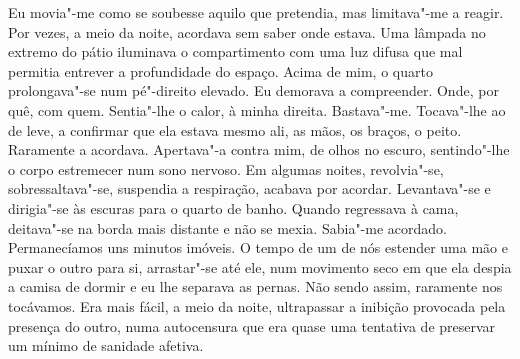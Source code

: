 Eu movia"-me como se soubesse aquilo que pretendia, mas limitava"-me a
reagir. Por vezes, a meio da noite, acordava sem saber onde estava. Uma
lâmpada no extremo do pátio iluminava o compartimento com uma luz difusa
que mal permitia entrever a profundidade do espaço. Acima de mim, o
quarto prolongava"-se num pé"-direito elevado. Eu demorava a
compreender. Onde, por quê, com quem. Sentia"-lhe o calor, à minha
direita. Bastava"-me. Tocava"-lhe ao de leve, a confirmar que ela estava
mesmo ali, as mãos, os braços, o peito. Raramente a acordava.
Apertava"-a contra mim, de olhos no escuro, sentindo"-lhe o corpo
estremecer num sono nervoso. Em algumas noites, revolvia"-se,
sobressaltava"-se, suspendia a respiração, acabava por acordar.
Levantava"-se e dirigia"-se às escuras para o quarto de banho. Quando
regressava à cama, deitava"-se na borda mais distante e não se mexia.
Sabia"-me acordado. Permanecíamos uns minutos imóveis. O tempo de um de
nós estender uma mão e puxar o outro para si, arrastar"-se até ele, num
movimento seco em que ela despia a camisa de dormir e eu lhe separava as
pernas. Não sendo assim, raramente nos tocávamos. Era mais fácil, a meio
da noite, ultrapassar a inibição provocada pela presença do outro, numa
autocensura que era quase uma tentativa de preservar um mínimo de
sanidade afetiva.

